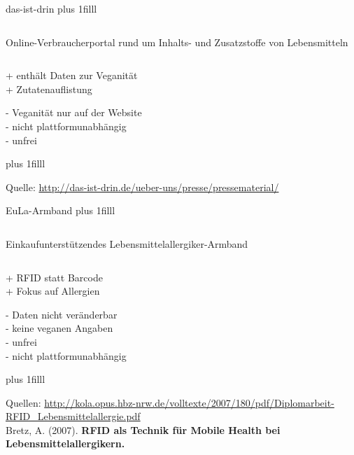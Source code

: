 \documentclass{beamer}
\begin{document}
\begin{frame}{das-ist-drin}
	\vskip0pt plus 1filll
	\begin{columns}
			{\large Online-Verbraucherportal rund um Inhalts- und Zusatzstoffe
			von Lebensmitteln}
			\centering
	\end{columns}
	
	\begin{exampleblock}{}
		+ enthält Daten zur Veganität\\
		+ Zutatenauflistung
	\end{exampleblock}

	\begin{alertblock}{}
		- Veganität nur auf der Website\\
		- nicht plattformunabhängig\\
		- unfrei\\
	\end{alertblock}
	\vskip0pt plus 1filll
	\par\hrulefill\par
	\tiny{Quelle:
	\url{http://das-ist-drin.de/ueber-uns/presse/pressematerial/}}
\end{frame}

\begin{frame}{EuLa-Armband}
	\vskip0pt plus 1filll
	\begin{columns}
		\column{.60\textwidth}
			{\large Einkaufunterstützendes Lebensmittelallergiker-Armband}
		\column{.40\textwidth}
			\centering
	\end{columns}

	\begin{exampleblock}{}
		+ RFID statt Barcode\\
		+ Fokus auf Allergien
	\end{exampleblock}
	
	\begin{alertblock}{}
		- Daten nicht veränderbar\\
		- keine veganen Angaben\\
		- unfrei\\
		- nicht plattformunabhängig
	\end{alertblock}

	\vskip0pt plus 1filll
	\par\hrulefill\par
	\tiny{Quellen:
	\url{http://kola.opus.hbz-nrw.de/volltexte/2007/180/pdf/Diplomarbeit-RFID_Lebensmittelallergie.pdf}}\\
	Bretz, A. (2007). \textbf{RFID als Technik für Mobile Health bei
	Lebensmittelallergikern.}
\end{frame}
\end{document}

